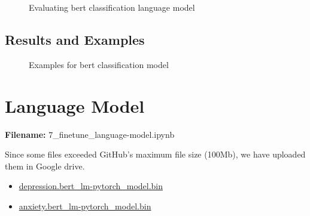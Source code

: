 \documentclass[12pt, a4paper]{article}
\begin{document}
\begin{figure}[H]
	\caption{Evaluating bert classification language model}
	\label{classification-lm_eval}
\end{figure}

\subsection*{Results and Examples}
\begin{figure}[H]
	\caption{Examples for bert classification model}
	\label{classification-lm_examples}
\end{figure}


\section*{Language Model}
\large{\textbf{Filename:} 7\_finetune\_language-model.ipynb}

Since some files exceeded GitHub's maximum file size (100Mb), we have uploaded them in Google drive. 
\begin{itemize}
	\item \href{https://drive.google.com/file/d/1AmbAl9mFoGG9mITTTz7TRgPEwVUAiN9U/view?usp=sharing}{depression.bert\_lm-pytorch\_model.bin}
	\item
	\href{https://drive.google.com/file/d/19-KhVSsBFo7WpfzeXNKDpUnYKv5xfDkY/view?usp=sharing}{anxiety.bert\_lm-pytorch\_model.bin}
\end{itemize}
\end{document}
